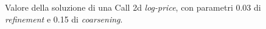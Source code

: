 \documentclass[a4paper,10pt]{report}
\theoremstyle{plain}
\theoremstyle{definition}
\theoremstyle{remark}
\begin{document}
\begin{figure}[htp!]
\begin{center}
\caption{Valore della soluzione di una Call 2d \emph{log-price}, con parametri 0.03 di \emph{refinement} e 0.15 di \emph{coarsening}.}
\label{fig:test5-1}
\end{center}
\end{figure}
\end{document}
